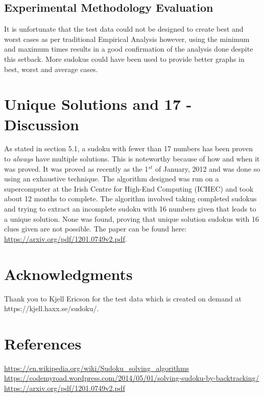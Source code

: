 \documentclass{article}
\begin{document}
\subsection{Experimental Methodology Evaluation}
It is unfortunate that the test data could not be designed to create best and worst cases as per traditional Empirical Analysis however, using the minimum and maximum times results in a good confirmation of the analysis done despite this setback. More sudokus could have been used to provide better graphs in best, worst and average cases.

\newpage
\section{Unique Solutions and 17 - Discussion}
As stated in section 5.1, a sudoku with fewer than 17 numbers has been proven to \emph{always} have multiple solutions. This is noteworthy because of how and when it was proved. It was proved as recently as the 1$^{st}$ of January, 2012 and was done so using an exhaustive technique. The algorithm designed was run on a supercomputer at the Irish Centre for High-End Computing (ICHEC) and took about 12 months to complete. The algorithm involved taking completed sudokus and trying to extract an incomplete sudoku with 16 numbers given that leads to a unique solution. None was found, proving that unique solution sudokus with 16 clues given are not possible. The paper can be found here: \url{https://arxiv.org/pdf/1201.0749v2.pdf}.

\section{Acknowledgments}
Thank you to Kjell Ericson for the test data which is created on demand at https://kjell.haxx.se/sudoku/.

\section{References}
\url{https://en.wikipedia.org/wiki/Sudoku_solving_algorithms} \\
\url{https://codemyroad.wordpress.com/2014/05/01/solving-sudoku-by-backtracking/}
\url{https://arxiv.org/pdf/1201.0749v2.pdf}
\end{document}
